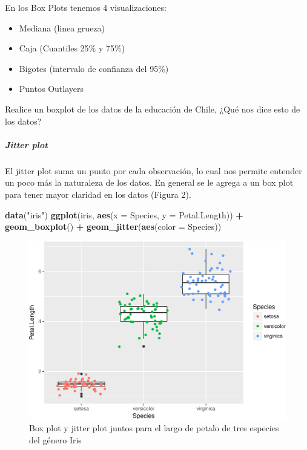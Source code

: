 \documentclass[]{article}
\newenvironment{Shaded}{\begin{snugshade}}{\end{snugshade}}
\newcommand{\KeywordTok}[1]{\textcolor[rgb]{0.13,0.29,0.53}{\textbf{#1}}}
\newcommand{\DataTypeTok}[1]{\textcolor[rgb]{0.13,0.29,0.53}{#1}}
\newcommand{\StringTok}[1]{\textcolor[rgb]{0.31,0.60,0.02}{#1}}
\newcommand{\OperatorTok}[1]{\textcolor[rgb]{0.81,0.36,0.00}{\textbf{#1}}}
\newcommand{\NormalTok}[1]{#1}
\providecommand{\tightlist}{%
  \setlength{\itemsep}{0pt}\setlength{\parskip}{0pt}}
\let\oldsubparagraph\subparagraph
\renewcommand{\subparagraph}[1]{\oldsubparagraph{#1}\mbox{}}
\begin{document}
En los Box Plots tenemos 4 visualizaciones:

\begin{itemize}
\tightlist
\item
  Mediana (linea grueza)
\item
  Caja (Cuantiles 25\% y 75\%)
\item
  Bigotes (intervalo de confianza del 95\%)
\item
  Puntos Outlayers
\end{itemize}

Realice un boxplot de los datos de la educación de Chile, ¿Qué nos dice
esto de los datos?

\subparagraph{Jitter plot}\label{jitter-plot}

El jitter plot suma un punto por cada observación, lo cual nos permite
entender un poco más la naturaleza de los datos. En general se le agrega
a un box plot para tener mayor claridad en los datos (Figura 2).

\begin{Shaded}
\begin{Highlighting}[]
\KeywordTok{data}\NormalTok{(}\StringTok{"iris"}\NormalTok{)}
\KeywordTok{ggplot}\NormalTok{(iris, }\KeywordTok{aes}\NormalTok{(}\DataTypeTok{x =}\NormalTok{ Species, }\DataTypeTok{y =}\NormalTok{ Petal.Length)) }\OperatorTok{+}\StringTok{ }\KeywordTok{geom_boxplot}\NormalTok{() }\OperatorTok{+}\StringTok{ }\KeywordTok{geom_jitter}\NormalTok{(}\KeywordTok{aes}\NormalTok{(}\DataTypeTok{color =}\NormalTok{ Species))}
\end{Highlighting}
\end{Shaded}

\begin{figure}
\centering
\includegraphics{Guia2_files/figure-latex/unnamed-chunk-6-1.pdf}
\caption{Box plot y jitter plot juntos para el largo de petalo de tres
especies del género Iris}
\end{figure}
\end{document}
